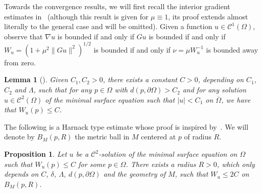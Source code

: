 \documentclass[a4paper,10pt,reqno]{amsart}
\newtheorem{proposition}[theorem]{Proposition}
\newtheorem{lemma}[theorem]{Lemma}
\theoremstyle{definition}
\theoremstyle{remark}
\numberwithin{equation}{section}
\begin{document}
Towards the convergence results, we will first recall the interior gradient estimates in~\cite{RST} (although this result is given for $\mu\equiv 1$, its proof extends almost literally to the general case and will be omitted). Given a function $u\in\mathcal{C}^1(\Omega)$, observe that $\nabla u$ is bounded if and only if $Gu$ is bounded if and only if $W_u=(1+\mu^2\|Gu\|^2)^{1/2}$ is bounded if and only if $\nu=\mu W_u^{-1}$ is bounded away from zero.

\begin{lemma}[{\cite[Thm.~3.6]{RST}}]\label{lem:interior-gradient-estimate}
Given $C_1, C_2 > 0$, there exists a constant $C>0$, depending on $C_1$, $C_2$ and $\Lambda$, such that for any $p \in\Omega$ with $d(p, \partial \Omega) > C_2$ and for any solution $u\in\mathcal C^2(\Omega)$ of the minimal surface equation such that $|u|< C_1$ on $\overline\Omega$, we have that $W_u(p)\leq C$.
\end{lemma}


The following is a Harnack type estimate whose proof is inspired by~\cite[Thm.~4.4]{Younes}. We will denote by $B_M(p,R)$ the metric ball in $M$ centered at $p$ of radius $R$.

\begin{proposition}\label{prop:harnack}
Let $u$ be a $\mathcal C^2$-solution of the minimal surface equation on $\Omega$ such that $W_u(p)\leq C$ for some $p\in\Omega$. There exists a radius $R>0$, which only depends on $C$, $\delta$, $\Lambda$, $d(p,\partial\Omega)$ and the geometry of $M$, such that $W_u\leq 2C$ on  $B_M(p,R)$. 
\end{proposition}
\end{document}
